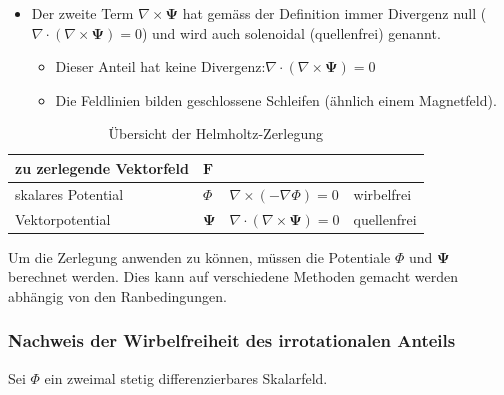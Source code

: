 \begin{itemize}
\begin{itemize}
\end{itemize}
\item Der zweite Term $\nabla \times \mathbf{\Psi}$ hat gemäss der Definition immer Divergenz null ($\nabla \cdot (\nabla \times \mathbf{\Psi}) = 0$) und wird auch solenoidal (quellenfrei) genannt. \newline
\begin{itemize}
\item Dieser Anteil hat keine Divergenz:$\nabla \cdot (\nabla \times \mathbf{\Psi}) = 0$
\item Die Feldlinien bilden geschlossene Schleifen (ähnlich einem Magnetfeld).
\end{itemize}
\end{itemize}

\begin{table}[h]
\centering
\begin{tabular}[h]{l|l|l|l}
\hline
zu zerlegende Vektorfeld & $\mathbf{F}$ & & \\
\hline 
skalares Potential & $\Phi $ & $\nabla \times (-\nabla \Phi) = 0$ & wirbelfrei\\
\hline
Vektorpotential & $\mathbf{\Psi}$ & $\nabla \cdot (\nabla \times \mathbf{\Psi}) = 0$ & quellenfrei\\
\hline
\end{tabular}\newline
\caption{Übersicht der Helmholtz-Zerlegung}
\end{table}

Um die Zerlegung anwenden zu können, müssen die Potentiale $\Phi $ und $\mathbf{\Psi}$ berechnet werden. Dies kann auf verschiedene Methoden gemacht werden abhängig von den Ranbedingungen.

\subsubsection{Nachweis der Wirbelfreiheit des irrotationalen Anteils}
Sei $\Phi$ ein zweimal stetig differenzierbares Skalarfeld.

